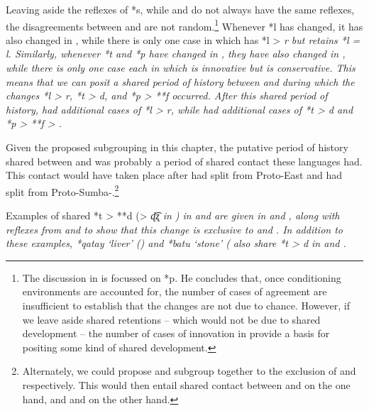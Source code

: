 Leaving aside the reflexes of *s,
while  and  do not always have the same reflexes,
the disagreements between 
and  are not random.\footnote{
		The discussion in \citet[93f]{Blust2008}
		is focussed on *p.
		He concludes that, once conditioning environments are accounted
		for, the number of cases of agreement are insufficient to establish
		that the changes are not due to chance.
		However, if we leave aside shared retentions -- which
		would not be due to shared development -- the
		number of cases of innovation in \trf{03-15}
		provide a basis for positing some kind of shared development.}
Whenever  *l has changed,
it has also changed in ,
while there is only one case in which  has *l
> \it{r} but  retains *l = \it{l}.
Similarly, whenever *t and *p have changed in ,
they have also changed in ,
while there is only one case each in which  is innovative
but  is conservative.
This means that we can posit a shared period of history between
 and  during which the changes *l > \it{r},
*t > \it{d}, and *p > **f occurred.
After this shared period of history,
 had additional cases of *l > \it{r},
while  had additional cases of *t > \it{d}
and *p > **f > {\0}.

Given the proposed subgrouping in this chapter,
the putative period of history shared
between  and  was probably a period
of shared contact these languages had.
This contact would have taken place after
 had split from Proto-East 
and  had split from Proto-Sumba-.\footnote{
	Alternately, we could propose
	 and  subgroup together
	to the exclusion of  and  respectively.
	This would then entail shared contact between 
	and  on the one hand, and 
	and  on the other hand.}

Examples of shared *t > **d (> \it{ɖ͡ʐ} in ) in 
and  are given in 
and , along with reflexes from 
and  to show that this change is exclusive to  and .
In addition to these examples,
*qatay ‘liver’ ()
and *batu ‘stone’ ( also share *t > \it{d} in  and .

